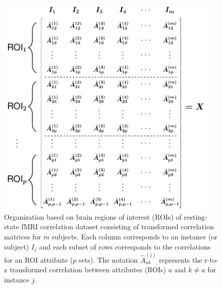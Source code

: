 \documentclass[aos]{imsart}
\begin{document}
\begin{figure}[H]
\begin{minipage}[c]{0.7\textwidth}
	\includegraphics[width=0.95\textwidth]{rs_fmri_all_instance_matrix.pdf}
\end{minipage}\hfill
\begin{minipage}[c]{0.3\textwidth}
	\caption{Organization based on brain regions of interest (ROIs) of resting-state fMRI correlation dataset consisting of transformed correlation matrices for $m$ subjects. Each column corresponds to an instance (or subject) $I_j$ and each subset of rows corresponds to the correlations for an ROI attribute ($p$ sets). The notation $\hat{A}^{(j)}_{ak}$ represents the r-to-z transformed correlation between attributes (ROIs) $a$ and $k \neq a$ for instance $j$.}\label{fig:rs-fMRI_matrix}
\end{minipage}
\end{figure}
\end{document}
